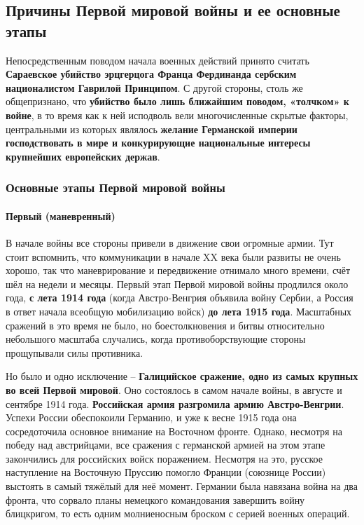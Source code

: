 \documentclass{article}
\begin{document}
\subsection{Причины Первой мировой войны и ее основные этапы}

Непосредственным поводом начала военных действий принято считать \textbf{Сараевское убийство эрцгерцога Франца Фердинанда сербским националистом Гаврилой Принципом}. С другой стороны, столь же общепризнано, что \textbf{убийство было лишь ближайшим поводом, «толчком» к войне}, в то время как к ней исподволь вели многочисленные скрытые факторы, центральными из которых являлось \textbf{желание Германской империи господствовать в мире и конкурирующие национальные интересы крупнейших европейских держав}. 

\subsubsection{Основные этапы Первой мировой войны}

\paragraph{Первый (маневренный)}

В начале войны все стороны привели в движение свои огромные армии. Тут стоит вспомнить, что коммуникации в начале XX века были развиты не очень хорошо, так что маневрирование и передвижение отнимало много времени, счёт шёл на недели и месяцы. Первый этап Первой мировой войны продлился около года, \textbf{с лета 1914 года} (когда Австро-Венгрия объявила войну Сербии, а Россия в ответ начала всеобщую мобилизацию войск) \textbf{до лета 1915 года}. Масштабных сражений в это время не было, но боестолкновения и битвы относительно небольшого масштаба случались, когда противоборствующие стороны прощупывали силы противника.

\hfill

Но было и одно исключение – \textbf{Галицийское сражение, одно из самых крупных во всей Первой мировой}. Оно состоялось в самом начале войны, в августе и сентябре 1914 года. \textbf{Российская армия разгромила армию Австро-Венгрии}. Успехи России обеспокоили Германию, и уже к весне 1915 года она сосредоточила основное внимание на Восточном фронте. Однако, несмотря на победу над австрийцами, все сражения с германской армией на этом этапе закончились для российских войск поражением. Несмотря на это, русское наступление на Восточную Пруссию помогло Франции (союзнице России) выстоять в самый тяжёлый для неё момент. Германии была навязана война на два фронта, что сорвало планы немецкого командования завершить войну блицкригом, то есть одним молниеносным броском с серией военных операций.
\end{document}
